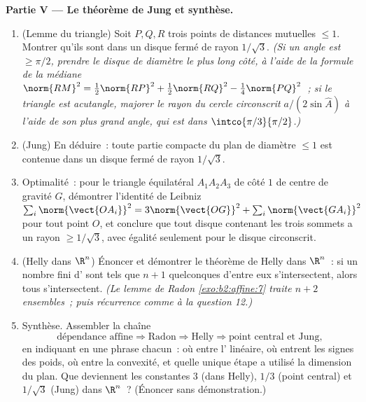 \begin{problem}
\medskip
\noindent\textbf{Partie V --- Le théorème de Jung et synthèse.}
\begin{enumerate}[resume]
  \item (Lemme du triangle) Soit $P, Q, R$ trois points de
        distances mutuelles $\leq 1$. Montrer qu'ils sont dans un
        disque fermé de rayon $1/\sqrt3$. \emph{(Si un
        angle est $\geq \pi/2$, prendre le disque de diamètre le
        plus long côté, à l'aide de la formule de la médiane
        $\norm{RM}^2 = \tfrac12\norm{RP}^2 +
        \tfrac12\norm{RQ}^2 - \tfrac14\norm{PQ}^2$~; si
        le triangle est acutangle, majorer le rayon du cercle
        circonscrit $a/(2\sin
        \widehat A)$ à l'aide de son plus grand angle, qui est dans
        $\intco{\pi/3}{\pi/2}$.)}
  \item (Jung) En déduire~: toute partie compacte du plan de
        diamètre $\leq 1$ est contenue dans un disque fermé de
        rayon $1/\sqrt3$.
  \item Optimalité~: pour le triangle équilatéral $A_1A_2A_3$
        de côté $1$ de centre de gravité $G$, démontrer l'identité
        de Leibniz $\sum_i \norm{\vect{OA_i}}^2 =
        3\norm{\vect{OG}}^2 + \sum_i \norm{\vect{GA_i}}^2$
        pour tout point $O$, et conclure que tout disque
        contenant les trois sommets a un rayon $\geq
        1/\sqrt3$, avec égalité seulement pour le disque circonscrit.
  \item (Helly dans $\R^n$) Énoncer et démontrer le théorème de Helly
        dans $\R^n$~: si un nombre fini d' sont tels
        que $n + 1$ quelconques d'entre eux s'intersectent, alors tous
        s'intersectent. \emph{(Le lemme de Radon
        \cref{exo:b2:affine:7} traite $n + 2$ ensembles~; puis
        récurrence comme à la question 12.)}
  \item Synthèse. Assembler la chaîne
        \[
        \text{dépendance affine} \Rightarrow \text{Radon}
        \Rightarrow \text{Helly} \Rightarrow
        \text{point central et Jung},
        \]
        en indiquant en une phrase chacun~: où entre l'
        linéaire, où entrent les signes des poids, où entre la
        convexité, et quelle unique étape a utilisé la dimension
        du plan. Que deviennent les constantes $3$ (dans Helly),
        $1/3$ (point central) et $1/\sqrt3$ (Jung) dans
        $\R^n$~? (Énoncer sans démonstration.)
\end{enumerate}
\end{problem}
